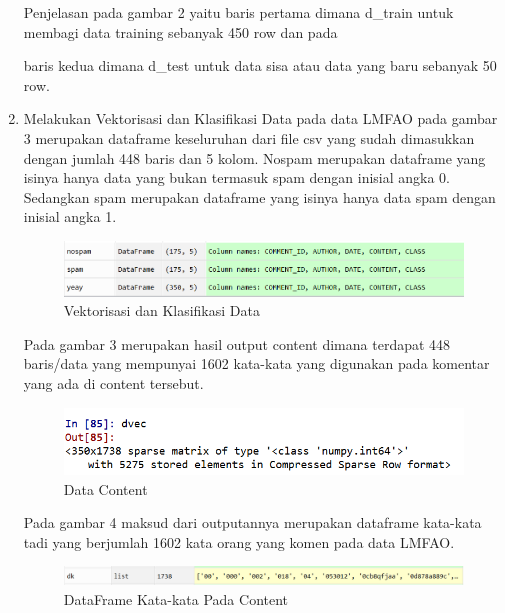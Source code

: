 \begin{enumerate}
\subitem Penjelasan pada gambar 2 yaitu baris pertama dimana d\_train untuk membagi data training sebanyak 450 row dan pada 
\par baris kedua dimana d\_test untuk data sisa atau data yang baru sebanyak 50 row.
\item Melakukan Vektorisasi dan Klasifikasi Data pada data LMFAO pada gambar 3  merupakan dataframe keseluruhan dari file csv yang sudah dimasukkan dengan jumlah 448 baris dan 5 kolom. Nospam merupakan dataframe yang isinya hanya data yang bukan termasuk spam dengan inisial angka 0. Sedangkan spam merupakan dataframe yang isinya hanya data spam dengan inisial angka 1.
\begin{figure}[ht]
\centerline{\includegraphics[width=1\textwidth]{figures/c4P/3.PNG}}
\caption{Vektorisasi dan Klasifikasi Data}
\label{Contoh Ilustrasi}
\end{figure}

\subitem  Pada gambar 3 merupakan hasil output content dimana terdapat 448 baris/data yang mempunyai 1602 kata-kata yang digunakan pada komentar yang ada di content tersebut.
\begin{figure}[ht]
	\centerline{\includegraphics[width=1\textwidth]{figures/c4P/4.PNG}}
	\caption{Data Content}
	\label{Contoh Ilustrasi}
\end{figure}

\subitem Pada gambar 4 maksud dari outputannya merupakan dataframe kata-kata tadi yang berjumlah 1602 kata orang 
 yang komen pada data LMFAO.
\begin{figure}[ht]
	\centerline{\includegraphics[width=1\textwidth]{figures/c4P/5.PNG}}
	\caption{DataFrame Kata-kata Pada Content}
	\label{Contoh Ilustrasi}
\end{figure}


\end{enumerate}
